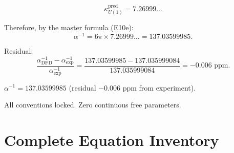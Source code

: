 \documentclass[12pt,a4paper]{article}
\begin{document}
\begin{equation}\tag{E17a}
\kappa_{U(1)}^{\mathrm{pred}} = 7.26999\ldots
\end{equation}

Therefore, by the master formula (E10e):
\begin{equation}\tag{E17b}
\boxed{\alpha^{-1} = 6\pi \times 7.26999\ldots = 137.03599985.}
\end{equation}

Residual:
\begin{equation}\tag{E17c}
\frac{\alpha^{-1}_{\mathrm{DFD}} - \alpha^{-1}_{\mathrm{exp}}}
     {\alpha^{-1}_{\mathrm{exp}}}
= \frac{137.03599985 - 137.035999084}{137.035999084}
= -0.006\text{ ppm}.
\end{equation}

\begin{tcolorbox}[colback=green!5!white,colframe=green!50!black,
title={Route 2 Result}]
$\alpha^{-1} = 137.03599985$ (residual $-0.006$ ppm from experiment).

All conventions locked. Zero continuous free parameters.
\end{tcolorbox}

\section{Complete Equation Inventory}
\label{sec:inventory}
\end{document}

